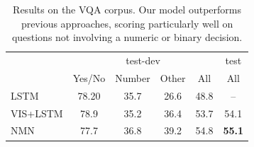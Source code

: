 \begin{table}
  \footnotesize
  \center
  \begin{tabular}{lccccc}
    \toprule
    & \multicolumn{4}{c}{test-dev} & test \\
    \cmidrule(lr){2-5} \cmidrule(lr){6-6}
    & Yes/No & Number & Other & All & All \\
    \midrule
    LSTM & 78.20 & 35.7 & 26.6 & 48.8 & -- \\
    VIS+LSTM & 78.9 & 35.2 & 36.4 & 53.7 & 54.1 \\
    NMN & 77.7 & 36.8 & 39.2 & 54.8 & \bf 55.1 \\
    \bottomrule
  \end{tabular}
  \caption{Results on the VQA corpus. Our model outperforms previous approaches,
    scoring particularly well on questions not involving a numeric or binary
    decision.}
    \label{tab:vqa-results}
\end{table}

